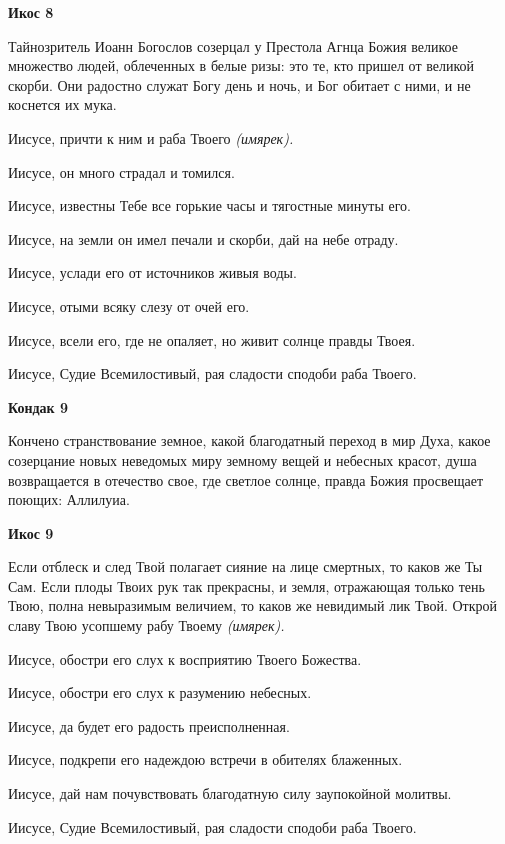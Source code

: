 \bfseries Икос 8\normalfont{}


Тайнозритель Иоанн Богослов созерцал у Престола Агнца Божия великое множество людей, облеченных в белые ризы: это те, кто пришел от великой скорби. Они радостно служат Богу день и ночь, и Бог обитает с ними, и не коснется их мука. 


Иисусе, причти к ним и раба Твоего \itshape (имярек)\normalfont{}. 


Иисусе, он много страдал и томился. 


Иисусе, известны Тебе все горькие часы и тягостные минуты его. 


Иисусе, на земли он имел печали и скорби, дай на небе отраду. 


Иисусе, услади его от источников живыя воды. 


Иисусе, отыми всяку слезу от очей его. 


Иисусе, всели его, где не опаляет, но живит солнце правды Твоея. 


Иисусе, Судие Всемилостивый, рая сладости сподоби раба Твоего.




\bfseries Кондак 9\normalfont{}


Кончено странствование земное, какой благодатный переход в мир Духа, какое созерцание новых неведомых миру земному вещей и небесных красот, душа возвращается в отечество свое, где светлое солнце, правда Божия просвещает поющих: Аллилуиа.




\bfseries Икос 9\normalfont{}


Если отблеск и след Твой полагает сияние на лице смертных, то каков же Ты Сам. Если плоды Твоих рук так прекрасны, и земля, отражающая только тень Твою, полна невыразимым величием, то каков же невидимый лик Твой. Открой славу Твою усопшему рабу Твоему \itshape (имярек)\normalfont{}. 


Иисусе, обостри его слух к восприятию Твоего Божества. 


Иисусе, обостри его слух к разумению небесных. 


Иисусе, да будет его радость преисполненная. 


Иисусе, подкрепи его надеждою встречи в обителях блаженных. 


Иисусе, дай нам почувствовать благодатную силу заупокойной молитвы. 


Иисусе, Судие Всемилостивый, рая сладости сподоби раба Твоего.




